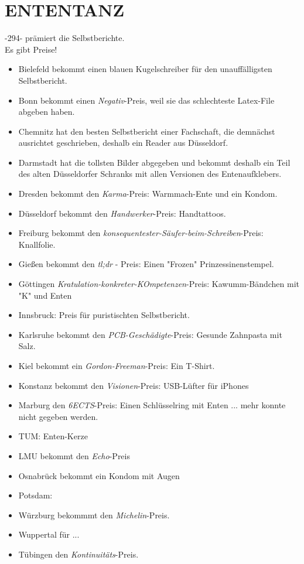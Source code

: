 \section{ENTENTANZ}
  -294- prämiert die Selbstberichte. \\
  Es gibt Preise!
  \begin{itemize}
    \item Bielefeld bekommt einen blauen Kugelschreiber für den unauffälligsten Selbstbericht.
    \item Bonn bekommt einen \textit{Negativ}-Preis, weil sie das schlechteste Latex-File abgeben haben.
    \item Chemnitz hat den besten Selbstbericht einer Fachschaft, die demnächst ausrichtet geschrieben, deshalb ein Reader aus Düsseldorf.
    \item Darmstadt hat die tollsten Bilder abgegeben und bekommt deshalb ein Teil des alten Düsseldorfer Schranks mit allen Versionen des Entenaufklebers.
    \item Dresden bekommt den \textit{Karma}-Preis: Warmmach-Ente und ein Kondom.
    \item Düsseldorf bekommt den \textit{Handwerker}-Preis: Handtattoos.
    \item Freiburg bekommt den \textit{konsequentester-Säufer-beim-Schreiben}-Preis: Knallfolie.
    \item Gießen bekommt den \textit{tl;dr} - Preis: Einen "Frozen" Prinzessinenstempel.
    \item Göttingen \textit{Kratulation-konkreter-KOmpetenzen}-Preis: Kawumm-Bändchen mit "K" und Enten
    \item Innsbruck: Preis für puristischten Selbstbericht.
    \item Karlsruhe bekommt den \textit{PCB-Geschädigte}-Preis: Gesunde Zahnpasta mit Salz.
    \item Kiel bekommt ein \textit{Gordon-Freeman}-Preis: Ein T-Shirt.
    \item Konstanz bekommt den \textit{Visionen}-Preis: USB-Lüfter für iPhones
    \item Marburg den \textit{6ECTS}-Preis: Einen Schlüsselring mit Enten ... mehr konnte nicht gegeben werden.
    \item TUM: Enten-Kerze
    \item LMU bekommt den \textit{Echo}-Preis
    \item Osnabrück bekommt ein Kondom mit Augen
    \item Potsdam:
    \item Würzburg bekommmt den \textit{Michelin}-Preis.
    \item Wuppertal für ...
    \item Tübingen den \textit{Kontinuitäts}-Preis.
  \end{itemize}

